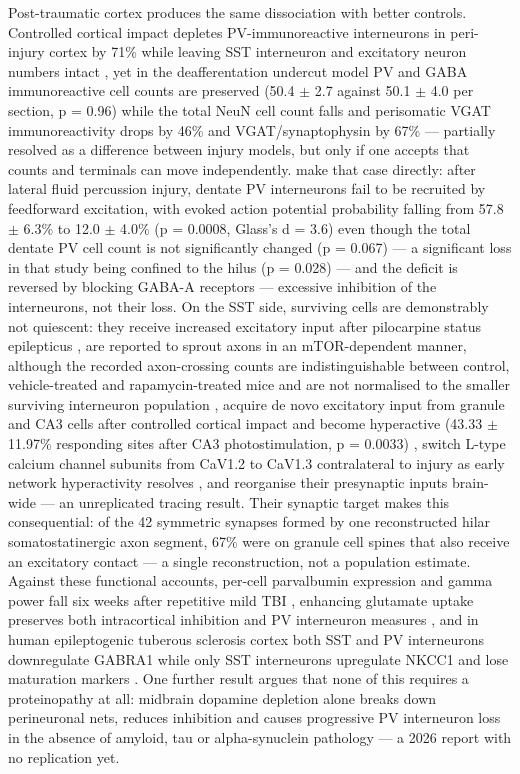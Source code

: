 \documentclass[11pt]{article}
\begin{document}
Post-traumatic cortex produces the same dissociation with better controls. Controlled cortical impact depletes PV-immunoreactive interneurons in peri-injury cortex by 71\% while leaving SST interneuron and excitatory neuron numbers intact \citep{Nichols2018}, yet in the deafferentation undercut model PV and GABA immunoreactive cell counts are preserved (50.4 $\pm$ 2.7 against 50.1 $\pm$ 4.0 per section, p = 0.96) while the total NeuN cell count falls and perisomatic VGAT immunoreactivity drops by 46\% and VGAT/synaptophysin by 67\% \citep{Gu2017} --- partially resolved as a difference between injury models, but only if one accepts that counts and terminals can move independently. \citet{Folweiler2020} make that case directly: after lateral fluid percussion injury, dentate PV interneurons fail to be recruited by feedforward excitation, with evoked action potential probability falling from 57.8 $\pm$ 6.3\% to 12.0 $\pm$ 4.0\% (p = 0.0008, Glass's d = 3.6) even though the total dentate PV cell count is not significantly changed (p = 0.067) --- a significant loss in that study being confined to the hilus (p = 0.028) --- and the deficit is reversed by blocking GABA-A receptors --- excessive inhibition of the interneurons, not their loss. On the SST side, surviving cells are demonstrably not quiescent: they receive increased excitatory input after pilocarpine status epilepticus \citep{Halabisky2010}, are reported to sprout axons in an mTOR-dependent manner, although the recorded axon-crossing counts are indistinguishable between control, vehicle-treated and rapamycin-treated mice and are not normalised to the smaller surviving interneuron population \citep{Buckmaster2011}, acquire de novo excitatory input from granule and CA3 cells after controlled cortical impact and become hyperactive (43.33 $\pm$ 11.97\% responding sites after CA3 photostimulation, p = 0.0033) \citep{Butler2017}, switch L-type calcium channel subunits from CaV1.2 to CaV1.3 contralateral to injury as early network hyperactivity resolves \citep{Ihbe2021}, and reorganise their presynaptic inputs brain-wide \citep{Frankowski2022} --- an unreplicated tracing result. Their synaptic target makes this consequential: of the 42 symmetric synapses formed by one reconstructed hilar somatostatinergic axon segment, 67\% were on granule cell spines that also receive an excitatory contact \citep{Buckmaster2002} --- a single reconstruction, not a population estimate. Against these functional accounts, per-cell parvalbumin expression and gamma power fall six weeks after repetitive mild TBI \citep{MacMullin2020}, enhancing glutamate uptake preserves both intracortical inhibition and PV interneuron measures \citep{Hameed2018}, and in human epileptogenic tuberous sclerosis cortex both SST and PV interneurons downregulate GABRA1 while only SST interneurons upregulate NKCC1 and lose maturation markers \citep{Scheper2024}. One further result argues that none of this requires a proteinopathy at all: midbrain dopamine depletion alone breaks down perineuronal nets, reduces inhibition and causes progressive PV interneuron loss in the absence of amyloid, tau or alpha-synuclein pathology \citep{Cauzzi2026} --- a 2026 report with no replication yet.
\end{document}
